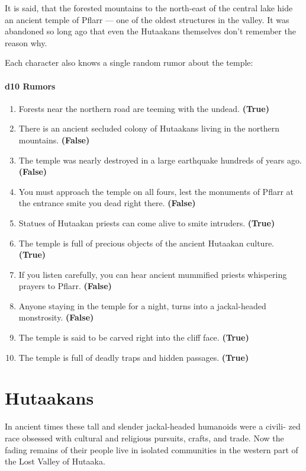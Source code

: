 \documentclass[english,11pt,openany,letterpaper,twocolumn]{book}
\begin{document}
It is said, that the forested mountains to the north-east of the central lake hide an ancient temple of Pflarr --- one of the oldest structures in the valley. It was abandoned so long ago that even the Hutaakans themselves don't remember the reason why.

\tab Each character also knows a single random rumor about the temple:

\paragraph{d10 Rumors}
\begin{enumerate}
	\item Forests near the northern road are teeming with the undead. \textbf{(True)}
	\item There is an ancient secluded colony of Hutaakans living in the northern mountains. \textbf{(False)}
	\item The temple was nearly destroyed in a large earthquake hundreds of years ago. \textbf{(False)}
	\item You must approach the temple on all fours, lest the monuments of Pflarr at the entrance smite you dead right there. \textbf{(False)}
	\item Statues of Hutaakan priests can come alive to smite intruders. \textbf{(True)}
	\item The temple is full of precious objects of the ancient Hutaakan culture. \textbf{(True)}
	\item If you listen carefully, you can hear ancient mummified priests whispering prayers to Pflarr. \textbf{(False)}
	\item Anyone staying in the temple for a night, turns into a jackal-headed monstrosity. \textbf{(False)}
	\item The temple is said to be carved right into the cliff face. \textbf{(True)}
	\item The temple is full of deadly traps and hidden passages. \textbf{(True)}
\end{enumerate}

\break

\section{Hutaakans}

In ancient times these tall and slender jackal-headed humanoids were a civili- zed race obsessed with cultural and religious pursuits, crafts, and trade. Now the fading remains of their people live in isolated communities in the western part of the Lost Valley of Hutaaka.
\end{document}
